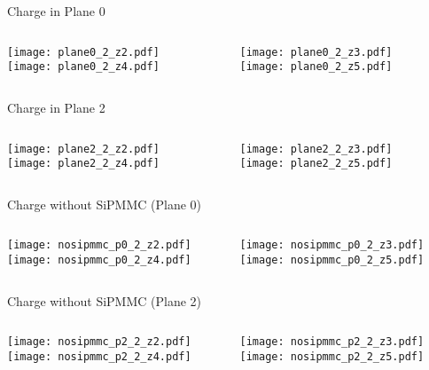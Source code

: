\documentclass{beamer}
\begin{document}
\begin{frame}{Charge in Plane 0}
	\begin{columns}[onlytextwidth]
		\begin{column}{0.5\textwidth}
			\texttt{[image: plane0\_2\_z2.pdf]} \\
			\texttt{[image: plane0\_2\_z4.pdf]}
		 \end{column}
		 \begin{column}{0.5\textwidth}
			\texttt{[image: plane0\_2\_z3.pdf]} \\
			\texttt{[image: plane0\_2\_z5.pdf]}
		 \end{column}
 \end{columns}
\end{frame}

\begin{frame}{Charge in Plane 2}
	\begin{columns}[onlytextwidth]
		\begin{column}{0.5\textwidth}
			\texttt{[image: plane2\_2\_z2.pdf]} \\
			\texttt{[image: plane2\_2\_z4.pdf]}
		 \end{column}
		 \begin{column}{0.5\textwidth}
			\texttt{[image: plane2\_2\_z3.pdf]} \\
			\texttt{[image: plane2\_2\_z5.pdf]}
		 \end{column}
 \end{columns}
\end{frame}

\begin{frame}{Charge without SiPMMC (Plane 0)}
	\begin{columns}[onlytextwidth]
		\begin{column}{0.5\textwidth}
			\texttt{[image: nosipmmc\_p0\_2\_z2.pdf]} \\
			\texttt{[image: nosipmmc\_p0\_2\_z4.pdf]}
		 \end{column}
		 \begin{column}{0.5\textwidth}
			\texttt{[image: nosipmmc\_p0\_2\_z3.pdf]} \\
			\texttt{[image: nosipmmc\_p0\_2\_z5.pdf]}
		 \end{column}
 \end{columns}
\end{frame}

\begin{frame}{Charge without SiPMMC (Plane 2)}
	\begin{columns}[onlytextwidth]
		\begin{column}{0.5\textwidth}
			\texttt{[image: nosipmmc\_p2\_2\_z2.pdf]} \\
			\texttt{[image: nosipmmc\_p2\_2\_z4.pdf]}
		 \end{column}
		 \begin{column}{0.5\textwidth}
			\texttt{[image: nosipmmc\_p2\_2\_z3.pdf]} \\
			\texttt{[image: nosipmmc\_p2\_2\_z5.pdf]}
		 \end{column}
 \end{columns}
\end{frame}
\end{document}
